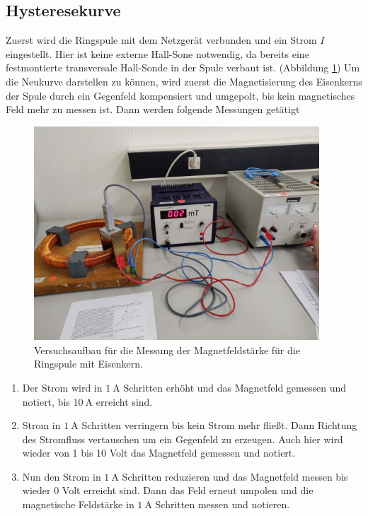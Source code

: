 \subsection{Hysteresekurve}
Zuerst wird die Ringspule mit dem Netzgerät verbunden und ein Strom $I$ eingestellt. Hier ist keine externe Hall-Sone notwendig,
da bereits eine festmontierte transversale Hall-Sonde in der Spule verbaut ist. (Abbildung \ref{fig:hysterese}) 
Um die Neukurve darstellen zu können, wird zuerst die Magnetisierung des Eisenkerns der Spule durch ein Gegenfeld
kompensiert und umgepolt, bis kein magnetisches Feld mehr zu messen ist. Dann werden folgende Messungen getätigt
\begin{figure}
    \centering
    \includegraphics[height=8cm]{content/ring.jpg}
    \caption{Versuchsaufbau für die Messung der Magnetfeldstärke für die Ringspule mit Eisenkern.}
    \label{fig:hysterese}
\end{figure}
\FloatBarrier
\begin{enumerate}
    \item Der Strom wird in $\SI{1}{\ampere}$ Schritten erhöht und das Magnetfeld gemessen und notiert, bis $\SI{10}{\ampere}$ erreicht sind.
    \item Strom in $\SI{1}{\ampere}$ Schritten verringern bis kein Strom mehr fließt. Dann Richtung
    des Stromfluss vertauschen um ein Gegenfeld zu erzeugen. Auch hier wird wieder von 1 bis 10 Volt das Magnetfeld gemessen und notiert.
    \item Nun den Strom in $\SI{1}{\ampere}$ Schritten reduzieren und das Magnetfeld messen bis wieder 0 Volt erreicht sind. Dann das Feld erneut umpolen
    und die magnetische Feldstärke in $\SI{1}{\ampere}$ Schritten messen und notieren.
\end{enumerate}